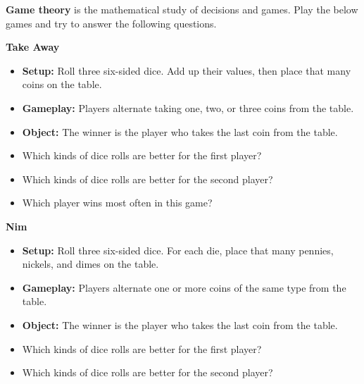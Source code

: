 

\newcommand{\activityname}{
  Secret of Nim
}
\newcommand{\subtitle}{
  It's all fun and Game Theory
}



\textbf{Game theory} is the mathematical study of decisions and games.
Play the below games and try to answer the following questions.

\bigskip\bigskip

\noindent\textbf{\huge Take Away}

\begin{itemize}
\item \textbf{Setup:} Roll three six-sided dice. Add up their values, then place
that many coins on the table.
\item \textbf{Gameplay:} Players alternate taking one, two, or three coins
from the table.
\item \textbf{Object:} The winner is the player who takes the last coin from
the table.
\end{itemize}


\begin{itemize}
\item Which kinds of dice rolls are better for the first player?
\item Which kinds of dice rolls are better for the second player?
\item Which player wins most often in this game?
\end{itemize}

\bigskip\bigskip

\noindent\textbf{\huge Nim}

\begin{itemize}
\item \textbf{Setup:} Roll three six-sided dice. For each die, place that
many pennies, nickels, and dimes on the table.
\item \textbf{Gameplay:} Players alternate one or more coins of the same
type from the table.
\item \textbf{Object:} The winner is the player who takes the last coin from
the table.
\end{itemize}


\begin{itemize}
\item Which kinds of dice rolls are better for the first player?
\item Which kinds of dice rolls are better for the second player?
\end{itemize}

